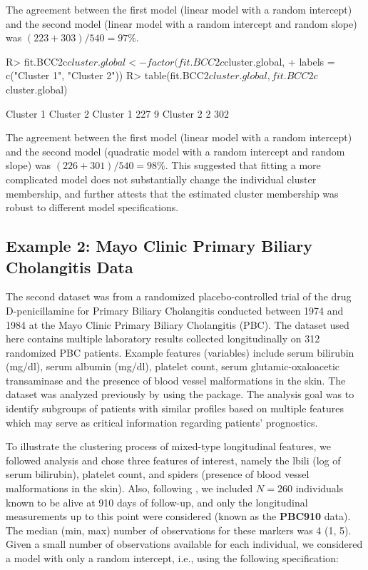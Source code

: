 The agreement between the first model (linear model with a random intercept) and the second model (linear model
with a random intercept and random slope) was $(223 + 303)/540 = 97\%$. 

\begin{example}
R> fit.BCC2c$cluster.global <- factor(fit.BCC2c$cluster.global,
+        labels = c("Cluster 1", "Cluster 2"))
R> table(fit.BCC2$cluster.global, fit.BCC2c$cluster.global)
\end{example} 

\begin{example}
            Cluster 1 Cluster 2
  Cluster 1       227       9
  Cluster 2         2       302
\end{example}

The agreement between the first model (linear model with a random intercept) and the second model (quadratic model with a random intercept and random slope) was $(226 + 301)/540 = 98\%$. This suggested that fitting a more complicated model does not substantially change the individual cluster membership, and further attests that the estimated cluster membership was robust to different model specifications. 

\subsection{Example 2: Mayo Clinic Primary Biliary Cholangitis Data}

The second dataset was from a randomized placebo-controlled trial of the drug D-penicillamine for Primary Biliary Cholangitis conducted between 1974 and 1984 at the Mayo Clinic Primary Biliary Cholangitis (PBC). The dataset used here contains multiple laboratory results collected longitudinally on 312 randomized PBC patients. Example features (variables) include serum bilirubin (mg/dl), serum albumin (mg/dl), platelet count, serum glutamic-oxaloacetic transaminase and the presence of blood vessel malformations in the skin. The dataset was analyzed previously by \citet{Komarek2013} using the  package. The analysis goal was to identify subgroups of patients with similar profiles based on multiple features which may serve as critical information regarding patients’ prognostics.

To illustrate the clustering process of mixed-type longitudinal features, we followed \citet{Komarek2013} analysis and chose three features of interest, namely the lbili (log of serum bilirubin), platelet count, and spiders (presence of blood vessel malformations in the skin). Also, following \citet{Komarek2013}, we included $N = 260$ individuals known to be alive at 910 days of follow-up, and only the longitudinal measurements up to this point were considered (known as the \textbf{PBC910} data). The median (min, max) number of observations for these markers was 4 (1, 5). Given a small number of observations available for each individual, we considered a model with only a random intercept, i.e., using the following specification:

